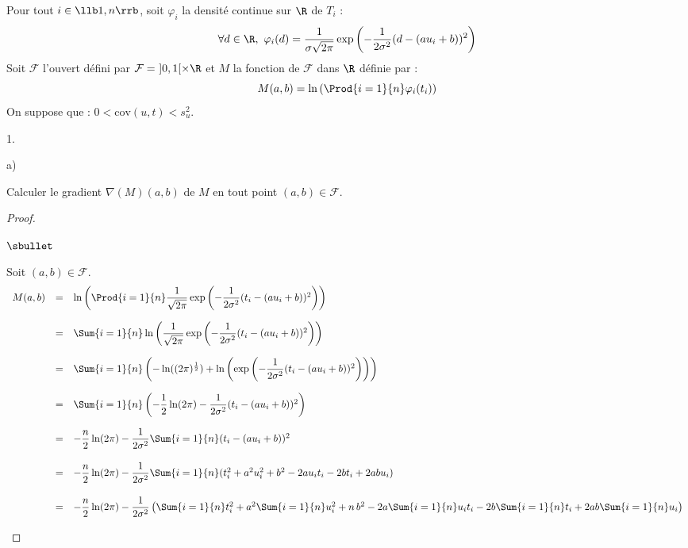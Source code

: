 \documentclass[11pt]{article}%
\begin{document}
\noindent
Pour tout $i \in \llb 1,n \rrb$, soit $\varphi_i$ la densité continue 
sur $\R$ de $T_i$ : 
\[
 \forall d \in \R, \ 
 \varphi_i(d)=\dfrac{1}{\sigma\sqrt{2\pi}}\exp\left(-\dfrac{1}{2\sigma^2
 } (d-(au_i+b))^2\right)
\]
Soit $\mathcal{F}$ l'ouvert défini par $\mathcal{F}= \ ]0,1[ \times \R$ 
et 
$M$ la fonction de $\mathcal{F}$ dans $\R$ définie par :
\[
 M(a,b)=\ln\left(\Prod{i=1}{n} \varphi_i(t_i)\right)
\]
On suppose que : $0 < \mathrm{cov}(u,t) < s_u^2$.

\begin{noliste}{1.}
 \setlength{\itemsep}{4mm}
 \setcounter{enumi}{9}
 \item 
 \begin{noliste}{a)}
  \setlength{\itemsep}{2mm}
  \item Calculer le gradient $\nabla(M)(a,b)$ de $M$ en tout point 
  $(a,b) \in \mathcal{F}$.
  
  \begin{proof}~
   \begin{noliste}{$\sbullet$}
    \item Soit $(a,b)\in\mathcal{F}$.
    \[
    \begin{array}{rcl}
      M(a,b) & = & \ln \left( \Prod{i=1}{n} \dfrac{1}{\sqrt{2\pi}}
        \exp\left(-\dfrac{1}{2\sigma^2}(t_i-(au_i+b))^2\right) \right) 
      \\[.6cm]
      &=& \Sum{i=1}{n} \ln \left( \dfrac{1}{\sqrt{2\pi}}
        \exp\left(-\dfrac{1}{2\sigma^2}(t_i-(au_i+b))^2\right) \right) 
      \\[.6cm]
      &=& \Sum{i=1}{n} \left( - \ln((2\pi)^{\frac{1}{2}}) +
      \ln\left( \exp\left(-\dfrac{1}{2\sigma^2}(t_i-(au_i+b))^2\right) 
      \right) \right)
      \\[.6cm]
      &=& \Sum{i=1}{n} \left( - \dfrac{1}{2} \ln(2\pi)
      -\dfrac{1}{2\sigma^2}(t_i-(au_i+b))^2\right)
      \\[.6cm]
      &=& -\dfrac{n}{2}\ln(2\pi)-\dfrac{1}{2\sigma^2}
	  \Sum{i=1}{n}(t_i-(au_i+b))^2
      \\[.6cm]
      &=& - \dfrac{n}{2} \ln(2\pi) - \dfrac{1}{2\sigma^2}
      \Sum{i=1}{n} (t_i^2 + a^2 u_i^2 + b^2 -2au_i t_i -2bt_i
      +2ab u_i)
      \\[.6cm]
      &=& - \dfrac{n}{2} \ln(2\pi) - \dfrac{1}{2\sigma^2}
      \left(\Sum{i=1}{n} t_i^2 + a^2 \Sum{i=1}{n} u_i^2 + n \, b^2 
      -2a \Sum{i=1}{n} u_i t_i -2b \Sum{i=1}{n} t_i
      +2ab \Sum{i=1}{n}u_i \right)
    \end{array}
    \]
    

\end{noliste}
\end{proof}
\end{noliste}
\end{noliste}
\end{document}
